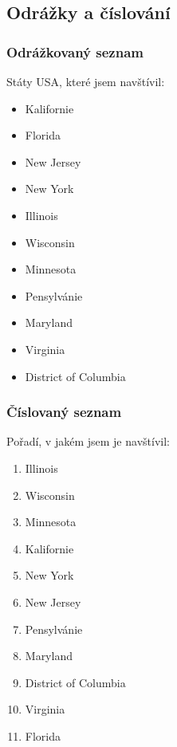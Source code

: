 \documentclass[12pt,a4paper,oneside]{article}
\numberwithin{equation}{section} %
\numberwithin{figure}{section} %
\numberwithin{table}{section} %
\begin{document}
\subsection{Odrážky a číslování}

\subsubsection{Odrážkovaný seznam}
Státy USA, které jsem navštívil:
\begin{itemize}
\item Kalifornie
\item Florida
\item New Jersey
\item New York
\item Illinois
\item Wisconsin
\item Minnesota
\item Pensylvánie
\item Maryland
\item Virginia
\item District of Columbia
\end{itemize}

\subsubsection{Číslovaný seznam}
Pořadí, v jakém jsem je navštívil:
\begin{enumerate}
\item Illinois
\item Wisconsin
\item Minnesota
\item Kalifornie
\item New York
\item New Jersey
\item Pensylvánie
\item Maryland
\item District of Columbia
\item Virginia
\item Florida
\end{enumerate}
\end{document}
